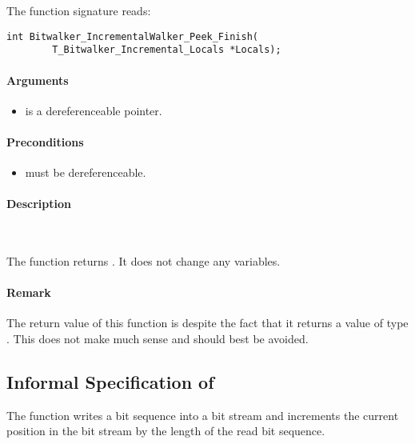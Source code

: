  The function signature reads:\\[1em]

\begin{lstlisting}[style=acsl-block]
int Bitwalker_IncrementalWalker_Peek_Finish(
        T_Bitwalker_Incremental_Locals *Locals);
\end{lstlisting}

\paragraph{Arguments}

\begin{itemize}
   \item  {} is a dereferenceable pointer.
\end{itemize}

\paragraph{Preconditions}
\begin{itemize}
   \item  {} must be dereferenceable.
\end{itemize}

\paragraph{Description}~

The function  returns .
It does not change any variables.

\paragraph*{Remark} The return value of this function is  despite
the fact that it returns a value of type .
This does not make much sense and should best be avoided.

\clearpage

\subsection{Informal Specification of }

The function \pokenext writes a bit sequence into a bit stream 
and increments the current position in the bit stream by the 
length of the read bit sequence.\\[1em]


